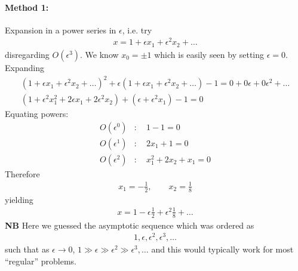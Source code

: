 \paragraph{Method 1:} Expansion in a power series in $\epsilon$, i.e. try
\begin{gather*}
	x = 1 + \epsilon x_1 + \epsilon^2 x_2 + \dots 
\end{gather*}
disregarding $O(\epsilon^3)$. We know $x_0 = \pm 1$ which is easily seen by setting $\epsilon=0$. Expanding
\begin{gather*}
	(1 + \epsilon x_1 + \epsilon^2 x_2 + \dots)^2 + \epsilon (1+ \epsilon x_1 + \epsilon^2 x_2 + \dots ) - 1 = 0 + 0 \epsilon + 0 \epsilon^2 + \dots \\
	(1 + \epsilon^2 x_1^2 + 2 \epsilon x_1 + 2 \epsilon^2 x_2) + (\epsilon + \epsilon^2 x_1) - 1 = 0
\end{gather*}
Equating powers:
\begin{align*}
	O(\epsilon^0) &: \quad 1 - 1 = 0 \\
	O(\epsilon^1) &: \quad 2x_1 + 1 = 0 \\
	O(\epsilon^2) &: \quad x_1^2 + 2x_2 + x_1 = 0 
\end{align*}
Therefore
\begin{align*}
	x_1 = -\frac{1}{2}, \qquad x_2 = \frac{1}{8}
\end{align*}
yielding
\begin{gather*}
	x = 1 - \epsilon\frac{1}{2} + \epsilon^2 \frac{1}{8} + \dots 
\end{gather*}
{\bf NB} Here we guessed the asymptotic sequence which was ordered as
\begin{gather*}
	{1,\epsilon,\epsilon^2,\epsilon^3,\dots}
\end{gather*}
such that as $\epsilon \rightarrow 0$, $1 \gg \epsilon \gg \epsilon^2 \gg \epsilon^3,\dots$ and this would typically work for most ``regular'' problems.

